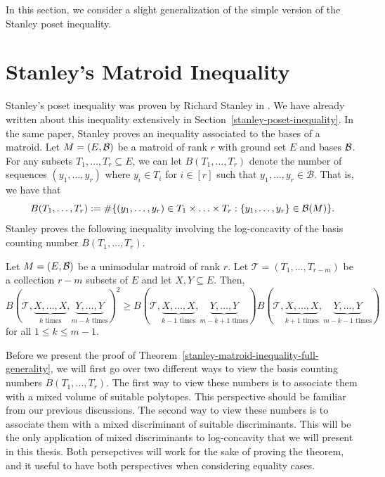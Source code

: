 \documentclass{puthesis-UG}
\begin{document}
In this section, we consider a slight generalization of the simple version of the Stanley poset inequality. 


\section{Stanley's Matroid Inequality} 

Stanley's poset inequality was proven by Richard Stanley in \cite{STANLEY}. We have already written about this inequality extensively in Section~\ref{stanley-poset-inequality}. In the same paper, Stanley proves an inequality associated to the bases of a matroid. Let $M = (E, \mathcal{B})$ be a matroid of rank $r$ with ground set $E$ and bases $\mathcal{B}$. For any subsets $T_1, \ldots, T_r \subseteq E$, we can let $B(T_1, \ldots, T_r)$ denote the number of sequences $(y_1, \ldots, y_r)$ where $y_i \in T_i$ for $i \in [r]$ such that ${y_1, \ldots, y_r} \in \mathcal{B}$. That is, we have that 
\[
	B(T_1, \ldots, T_r) := \# \{ (y_1, \ldots, y_r) \in T_1 \times \ldots \times T_r : \{y_1, \ldots, y_r\} \in \mathcal{B}(M) \}.
\]
Stanley proves the following inequality involving the log-concavity of the basis counting number $B(T_1, \ldots, T_r)$. 

\begin{thm} \label{stanley-matroid-inequality-full-generality}
	Let $M = (E, \mathcal{B})$ be a unimodular matroid of rank $r$. Let $\mathcal{T} = (T_1, \ldots, T_{r-m})$ be a collection $r-m$ subsets of $E$ and let $X, Y \subseteq E$. Then, 
	\[
		B(\mathcal{T}, \underbrace{X, \ldots, X}_{k \text{ times}}, \underbrace{Y, \ldots, Y}_{m-k \text{ times}})^2 \geq B(\mathcal{T}, \underbrace{X, \ldots, X}_{k-1 \text{ times}}, \underbrace{Y, \ldots, Y}_{m-k+1 \text{ times}}) B(\mathcal{T}, \underbrace{X, \ldots, X}_{k+1 \text{ times}}, \underbrace{Y, \ldots, Y}_{m-k-1 \text{ times}})
	\]
	for all $1 \leq k \leq m-1$. 
\end{thm}

Before we present the proof of Theorem~\ref{stanley-matroid-inequality-full-generality}, we will first go over two different ways to view the basis counting numbers $B(T_1, \ldots, T_r)$. The first way to view these numbers is to associate them with a mixed volume of suitable polytopes. This perspective should be familiar from our previous discussions. The second way to view these numbers is to associate them with a mixed discriminant of suitable discriminants. This will be the only application of mixed discriminants to log-concavity that we will present in this thesis. Both persepctives will work for the sake of proving the theorem, and it useful to have both perspectives when considering equality cases. \\
\end{document}
